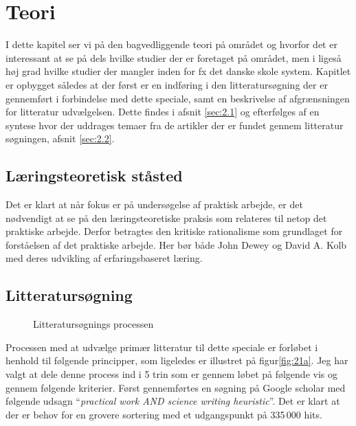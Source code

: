 \chapter{Teori}
\label{Ch:2}

I dette kapitel ser vi på den bagvedliggende teori på området og hvorfor det er interessant at se på dels hvilke studier der er foretaget på området, men i ligeså høj grad hvilke studier der mangler inden for fx det danske skole system. Kapitlet er opbygget således at der først er en indføring i den litteratursøgning der er gennemført i forbindelse med dette speciale, samt en beskrivelse af afgrænsningen for litteratur udvælgelsen. Dette findes i afsnit \vref{sec:2.1} og efterfølges af en syntese hvor der uddrages temaer fra de artikler der er fundet gennem litteratur søgningen, afsnit \vref{sec:2.2}.

\section{Læringsteoretisk ståsted}
\label{sec:2.0}
Det er klart at når fokus er på undersøgelse af praktisk arbejde, er det nødvendigt at se på den læringsteoretiske praksis som relateres til netop det praktiske arbejde. Derfor betragtes den kritiske rationalisme som grundlaget for forståelsen af det praktiske arbejde. Her bør både John Dewey og David A. Kolb med deres udvikling af erfaringsbaseret læring.

\section{Litteratursøgning}
\label{sec:2.1}


\begin{wrapfigure}{o}{0.5\textwidth}
	\centering
	\caption{Litteratursøgnings processen}
	\label{fig:21a}
\end{wrapfigure}

Processen med at udvælge primær litteratur til dette speciale er forløbet i henhold til følgende principper, som ligeledes er illustret på  figur\vref{fig:21a}. Jeg har valgt at dele denne process ind i 5 trin som er gennem løbet på følgende vis og gennem følgende kriterier. Først gennemførtes en søgning på Google scholar med følgende udsagn ``\emph{practical work AND science writing heuristic}''. Det er klart at der er behov for en grovere sortering med et udgangspunkt på 335\,000 hits. 

